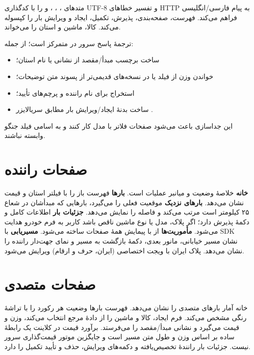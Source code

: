  متدهای ، ، ،  و  را با کدگذاری \textenglish{UTF-8} و تفسیر خطاهای \textenglish{HTTP} به پیام فارسی/انگلیسی فراهم می‌کند.  فهرست، صفحه‌بندی، پذیرش، تکمیل، ایجاد و ویرایش بار را کپسوله می‌کند.  کالا، ماشین و استان را می‌خواند.

ترجمهٔ پاسخ سرور در  متمرکز است؛ از جمله:

\begin{itemize}
  \item ساخت برچسب مبدأ/مقصد از نشانی یا نام استان؛
  \item خواندن وزن از فیلد  یا در نسخه‌های قدیمی‌تر از پسوند متن توضیحات؛
  \item استخراج  برای نام راننده و پرچم‌های تأیید؛
  \item ساخت بدنهٔ ایجاد/ویرایش بار مطابق سریالایزر .
\end{itemize}

این جداسازی باعث می‌شود صفحات فلاتر با مدل  کار کنند و به اسامی فیلد جنگو وابسته نباشند.

\section{صفحات راننده}

\textbf{خانه} خلاصهٔ وضعیت و میانبر عملیات است. \textbf{بارها} فهرست باز را با فیلتر استان و قیمت نشان می‌دهد. \textbf{بارهای نزدیک} موقعیت فعلی را می‌گیرد، بارهایی که مبدأشان در شعاع ۲۵ کیلومتر است مرتب می‌کند و فاصله را نمایش می‌دهد. \textbf{جزئیات بار} اطلاعات کامل و دکمهٔ پذیرش دارد؛ اگر پلاک، مدل یا نوع ماشین ناقص باشد کاربر به فرم خودرو هدایت می‌شود. \textbf{مأموریت‌ها} از  با پیمایش همهٔ صفحات ساخته می‌شود. \textbf{مسیریابی} با \textenglish{SDK} نشان مسیر خیابانی، مانور بعدی، دکمهٔ بازگشت به مسیر و نمای جهت‌دار راننده را نشان می‌دهد. پلاک ایران با ویجت اختصاصی (ایران، حرف و ارقام) ویرایش می‌شود.

\section{صفحات متصدی}

خانه آمار بارهای متصدی را نشان می‌دهد. فهرست بارها وضعیت هر رکورد را با تراشهٔ رنگی مشخص می‌کند. فرم ایجاد، کالا و ماشین را از دادهٔ مرجع انتخاب می‌کند، وزن و قیمت می‌گیرد و نشانی مبدأ/مقصد را می‌فرستد. برآورد قیمت در کلاینت یک رابطهٔ ساده بر اساس وزن و طول متن مسیر است و جایگزین موتور قیمت‌گذاری سرور نیست. جزئیات بار رانندهٔ تخصیص‌یافته و دکمه‌های ویرایش، حذف و تأیید تکمیل را دارد.

